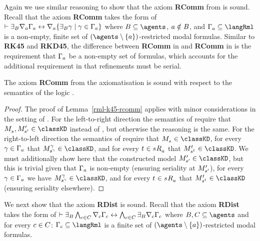 Again we use similar reasoning to show that the axiom {\bf RComm} from \axiomRmlK{} is sound.
Recall that the axiom {\bf RComm} takes the form of $\vdash {\exists_{B}} \nabla_{a} \Gamma_a \leftrightarrow \nabla_{a} \{{\exists_{B}} \gamma \mid \gamma \in \Gamma_a\}$ where $\agentsB \subseteq \agents$, $a \notin B$, and $\Gamma_\agentA \subseteq \langRml$ is a non-empty, finite set of $(\agents \setminus \{\agentA\})$-restricted modal formulas.
Similar to {\bf RK45} and {\bf RKD45}, the difference between {\bf RComm} in \axiomRmlKFF{} and {\bf RComm} in \axiomRmlKD{} is the requirement that $\Gamma_a$ be a non-empty set of formulas, which accounts for the additional requirement in \logicRmlKD{} that refinements must be serial.

\begin{lemma}\label{rml-kd45-rcomm}
The axiom {\bf RComm} from the axiomatisation \axiomRmlKD{} is sound with respect to the semantics of the logic \logicRmlKD{}.
\end{lemma}

\begin{proof}
The proof of Lemma~\ref{rml-k45-rcomm} applies with minor considerations in the setting of \logicRmlKD{}.
For the left-to-right direction the semantics of \logicRmlKD{} require that $\kPModel{\kStateS}, \kPModelP{\kStateSP} \in \classKD$ instead of \classKFF{}, but otherwise the reasoning is the same.
For the right-to-left direction the semantics of \logicRmlKD{} require that $\kPModel{\kStateS} \in \classKD$, for every $\gamma \in \Gamma_a$ that $\kPModel[\gamma]{\kStateS[\gamma]} \in \classKD$, and for every $\kStateT \in \kSuccessorsA{\kStateS}$ that $\kPModel[\kStateT]{\kStateS[\kStateT]} \in \classKD$.
We must additionally show here that the constructed model $\kPModelP{\kStateSP} \in \classKD$, but this is trivial given that $\Gamma_a$ is non-empty (ensuring seriality at ${M^{\prime}_{{s}^{\prime}}}$), for every $\gamma \in \Gamma_a$ we have $\kPModel[\gamma]{\kStateS[\gamma]} \in \classKD$, and for every $\kStateT \in \kSuccessorsA{\kStateS}$ that $\kPModel[\kStateT]{\kStateS[\kStateT]} \in \classKD$ (ensuring seriality elsewhere).
\end{proof}

We next show that the axiom {\bf RDist} is sound.
Recall that the axiom {\bf RDist} takes the form of $\vdash {\exists_{B}} \bigwedge_{c \in C} \nabla_{c} \Gamma_c \leftrightarrow \bigwedge_{c \in C} {\exists_{B}} \nabla_{c} \Gamma_c$ where $\agentsB, \agentsC \subseteq \agents$ and for every $c \in C$: $\Gamma_\agentC \subseteq \langRml$ is a finite set of $(\agents \setminus \{\agentA\})$-restricted modal formulas.


